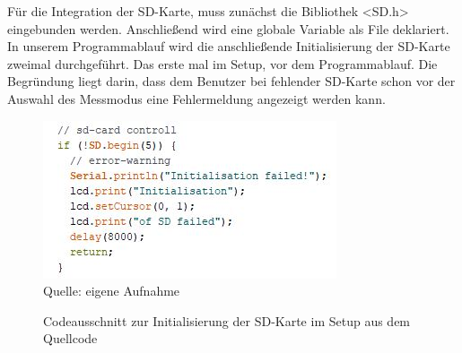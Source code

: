 Für die Integration der SD-Karte, muss zunächst die Bibliothek <SD.h> eingebunden werden. Anschließend wird eine globale Variable als File deklariert. In unserem Programmablauf wird die anschließende Initialisierung der SD-Karte zweimal durchgeführt. Das erste mal im Setup, vor dem Programmablauf. Die Begründung liegt darin, dass dem Benutzer bei fehlender SD-Karte schon vor der Auswahl des Messmodus eine Fehlermeldung angezeigt werden kann. 

\begin{figure}[!hbt]
	\centering
	\includegraphics[width=0.6\linewidth]{Images/sdSetup}
	\footnotesize{\\ Quelle: eigene Aufnahme}
	\caption{Codeausschnitt zur Initialisierung der SD-Karte im Setup aus dem Quellcode}
	\label{fig:SD_Setup}
\end{figure}

